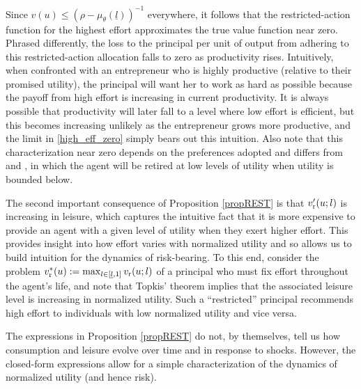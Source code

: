 \documentclass[11pt]{article}
\theoremstyle{plain}
\begin{document}
Since $v(u) \leq (\rho - \mu_{\theta}(\underline{l}))^{-1}$ everywhere, it follows that the restricted-action function for the highest effort approximates the true value function near zero. Phrased differently, the loss to the principal per unit of output from adhering to this restricted-action allocation falls to zero as productivity rises. Intuitively, when confronted with an entrepreneur who is highly productive (relative to their promised utility), the principal will want her to work as hard as possible because the payoff from high effort is increasing in current productivity. It is always possible that productivity will later fall to a level where low effort is efficient, but this becomes increasing unlikely as the entrepreneur grows more productive, and the limit in \eqref{high_eff_zero} simply bears out this intuition. Also note that this characterization near zero depends on the preferences adopted and differs from \cite{phelan_computing_1991} and \cite{sannikov_continuous-time_2008}, in which the agent will be retired at low levels of utility when utility is bounded below. 

The second important consequence of Proposition \ref{propREST} is that $v_{\textnormal{r}}'(u;l)$ is increasing in leisure, which captures the intuitive fact that it is more expensive to provide an agent with a given level of utility when they exert higher effort. This provides insight into how effort varies with normalized utility and so allows us to build intuition for the dynamics of risk-bearing. To this end, consider the problem $v^*_{\textnormal{r}}(u) := \max_{l \in [\underline{l},1]} v_{\textnormal{r}}(u;l)$ of a principal who must fix effort throughout the agent's life, and note that Topkis' theorem implies that the associated leisure level is increasing in normalized utility. Such a ``restricted'' principal recommends high effort to individuals with low normalized utility and vice versa. 

The expressions in Proposition \ref{propREST} do not, by themselves, tell us how consumption and leisure evolve over time and in response to shocks. However, the closed-form expressions allow for a simple characterization of the dynamics of normalized utility (and hence risk).
\end{document}
